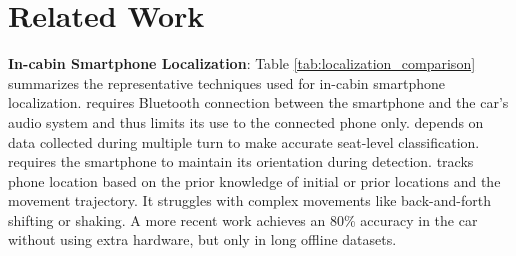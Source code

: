 \documentclass[sigconf]{acmart}
\newcommand{\name}{{{\tt UWB-PTrac}}}
\newcommand{\vp}{\vspace{-1.5em}}
\begin{document}
\vspace{-0.05in}
\section{Related Work}
\label{sec:relatedwork}
\textbf{In-cabin Smartphone Localization}:
Table \ref{tab:localization_comparison} summarizes the representative techniques used for in-cabin smartphone localization.
\cite{yang2011detecting} requires Bluetooth connection between the 
smartphone and the car's audio system and thus limits its use to the 
connected phone only.
\cite{wang2013sensing} depends on data collected during multiple turn to make 
accurate seat-level classification. 
\cite{johnson2020smartphone} requires the smartphone to maintain its 
orientation during detection. \cite{chen2022vehicle} tracks phone location 
based on the prior knowledge of initial or prior locations and the
movement trajectory. It struggles with complex movements like 
back-and-forth shifting or shaking. 
A more recent work \cite{pargal2024zero} achieves an 80\% accuracy in
the car without using extra hardware, but only in long offline datasets. 
\end{document}
